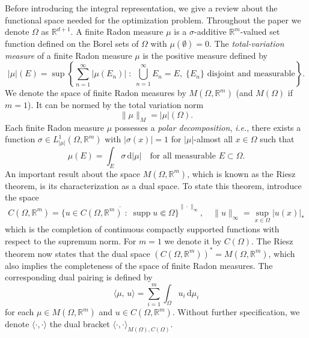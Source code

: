 \documentclass[12pt,fleqn]{amsart}
\theoremstyle{definition}
\begin{document}
Before introducing the integral representation, we give a review about the functional space needed for the optimization problem.  
Throughout the paper we denote $\Omega$ as $\mathbb{R}^{d + 1}$. 
A finite Radon measure $\mu$ is a $\sigma$-additive $\mathbb{R}^m$-valued set function defined on the Borel sets of $\Omega$ with $\mu(\emptyset) = 0$.                                                                              
The \emph{total-variation measure} of a finite Radon measure $\mu$ is the positive measure defined by                                                                                                                                       
\[                                                                                                                                                                                                                                          
|\mu|(E) = \sup \left\{ \sum_{n=1}^{\infty} |\mu(E_n)| \;:\; \bigcup_{n=1}^{\infty} E_n = E,\; \{E_n\} \text{ disjoint and measurable} \right\}.
\]
We denote the space of finite Radon measures by $M(\Omega, \mathbb{R}^m)$ (and $M(\Omega)$ if $m = 1$). It can be normed by the total variation norm
\[
\|\mu\|_{M} = |\mu|(\Omega).
\]
Each finite Radon measure $\mu$ possesses a \emph{polar decomposition}, \emph{i.e.}, there exists a function $\sigma \in L^1_{|\mu|}(\Omega, \mathbb{R}^m)$ with $|\sigma(x)| = 1$ for $|\mu|$-almost all $x \in \Omega$ such that
\[
\mu(E) = \int_E \sigma \, \mathrm{d}|\mu| \quad \text{for all measurable } E \subset \Omega.
\]
An important result about the space $M(\Omega, \mathbb{R}^m)$, which is known as the Riesz theorem, is its characterization as a dual space. To state this theorem, introduce the space
\[
C(\Omega, \mathbb{R}^m) = \overline{\{u \in C(\Omega, \mathbb{R}^m) \;:\; \operatorname{supp} u \Subset \Omega\}}^{\|\cdot\|_\infty}, \quad \|u\|_\infty = \sup_{x \in \Omega} |u(x)|_*
\]
which is the completion of continuous compactly supported functions with respect to the supremum norm. 
For $m = 1$ we denote it by $C(\Omega)$. 
The Riesz theorem now states that the dual space $(C(\Omega,
\mathbb{R}^m))^* = M(\Omega, \mathbb{R}^m)$, which also implies the completeness of the space of finite Radon measures. The corresponding dual pairing is defined by
\[
\langle \mu,\, u \rangle = \sum_{i=1}^{m} \int_\Omega u_i \, \mathrm{d}\mu_i
\]
for each $\mu \in M(\Omega, \mathbb{R}^m)$ and $u \in C(\Omega, \mathbb{R}^m)$.
Without further specification, we denote $\langle \cdot, \cdot\rangle$ the dual bracket $\langle \cdot, \cdot \rangle_{M(\Omega), C(\Omega)}$. 
\end{document}
